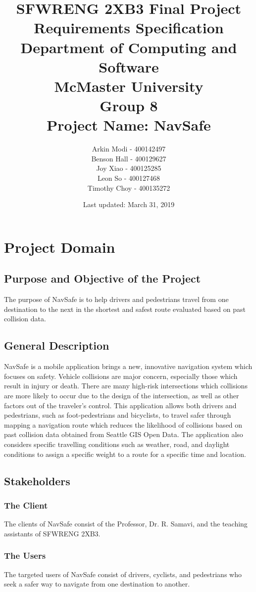 \documentclass[12pt]{article}
\title{
    SFWRENG 2XB3 Final Project \\
    \large Requirements Specification\\
    \vspace{1ex}
    \large Department of Computing and Software\\
    \large McMaster University\\
    \vspace{1ex}
    \large Group 8\\
    \large Project Name: NavSafe
}
\author{
    Arkin Modi - 400142497\\
    Benson Hall - 400129627\\
    Joy Xiao - 400125285\\
    Leon So - 400127468\\
    Timothy Choy - 400135272
}
\date{Last updated: March 31, 2019}
\begin{document}
\maketitle
\newpage
\tableofcontents
\newpage

\section{Project Domain}
\subsection{Purpose and Objective of the Project}
The purpose of NavSafe is to help drivers and pedestrians travel from one destination to the next in the shortest and safest route evaluated based on past collision data. 

\subsection{General Description}
NavSafe is a mobile application brings a new, innovative navigation system which focuses on safety. Vehicle collisions are major concern, especially those which result in injury or death. There are many high-risk intersections which collisions are more likely to occur due to the design of the intersection, as well as other factors out of the traveler’s control. This application allows both drivers and pedestrians, such as foot-pedestrians and bicyclists, to travel safer through mapping a navigation route which reduces the likelihood of collisions based on past collision data obtained from Seattle GIS Open Data. The application also considers specific travelling conditions such as weather, road, and daylight conditions to assign a specific weight to a route for a specific time and location.

\subsection{Stakeholders}

    \subsubsection{The Client}
    The clients of NavSafe consist of the Professor, Dr. R. Samavi, and the teaching assistants of SFWRENG 2XB3.
    
    \subsubsection{The Users}
    The targeted users of NavSafe consist of drivers, cyclists, and pedestrians who seek a safer way to navigate from one destination to another.
    
\end{document}
